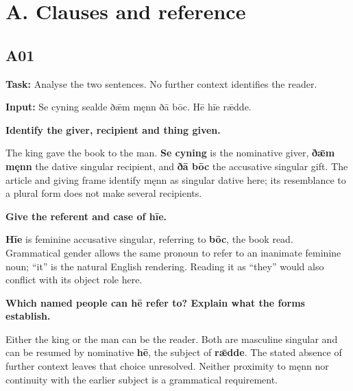 \section*{A. Clauses and reference}

\subsection*{A01}

\textbf{Task:} Analyse the two sentences. No further context identifies the reader.

\textbf{Input:} Se cyning sealde ðǣm męnn ðā bōc. Hē hīe rǣdde.

\textbf{Identify the giver, recipient and thing given.}

The king gave the book to the man. \textbf{Se cyning} is the nominative giver, \textbf{ðǣm męnn} the dative singular recipient, and \textbf{ðā bōc} the accusative singular gift. The article and giving frame identify męnn as singular dative here; its resemblance to a plural form does not make several recipients.

\textbf{Give the referent and case of hīe.}

\textbf{Hīe} is feminine accusative singular, referring to \textbf{bōc}, the book read. Grammatical gender allows the same pronoun to refer to an inanimate feminine noun; “it” is the natural English rendering. Reading it as “they” would also conflict with its object role here.

\textbf{Which named people can hē refer to? Explain what the forms establish.}

Either the king or the man can be the reader. Both are masculine singular and can be resumed by nominative \textbf{hē}, the subject of \textbf{rǣdde}. The stated absence of further context leaves that choice unresolved. Neither proximity to męnn nor continuity with the earlier subject is a grammatical requirement.

